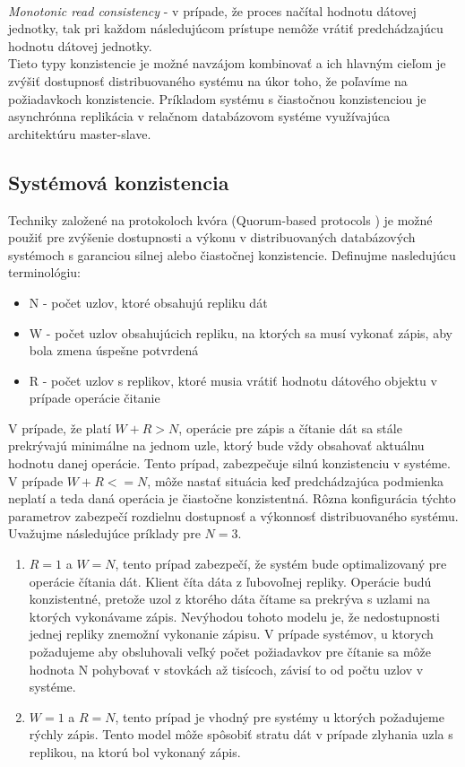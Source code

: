 \documentclass[11pt,twoside,a4paper]{book}
\begin{document}
\noindent 
\\
\emph{Monotonic read consistency} - v prípade, že proces načítal hodnotu dátovej jednotky, tak pri každom následujúcom prístupe nemôže vrátiť predchádzajúcu hodnotu dátovej jednotky. \\



Tieto typy konzistencie je možné navzájom kombinovať a ich hlavným cieľom je zvýšiť dostupnosť distribuovaného systému na úkor toho, že poľavíme na požiadavkoch konzistencie. Príkladom systému s čiastočnou konzistenciou je asynchrónna replikácia v relačnom databázovom systéme využívajúca architektúru master-slave.

\subsection{Systémová konzistencia}

Techniky založené na protokoloch kvóra (Quorum-based protocols \cite{gifford1979weighted}) je možné použiť pre zvýšenie dostupnosti a výkonu v distribuovaných databázových systémoch s garanciou silnej alebo čiastočnej konzistencie. Definujme nasledujúcu terminológiu:
\begin{itemize}
 \item N - počet uzlov, ktoré obsahujú repliku dát
 \item W - počet uzlov obsahujúcich repliku, na ktorých sa musí vykonať zápis, aby bola zmena úspešne potvrdená
 \item R - počet uzlov s replikov, ktoré musia vrátiť hodnotu dátového objektu v prípade operácie čitanie
\end{itemize}

V prípade, že platí $W + R > N$, operácie pre zápis a čítanie dát sa stále prekrývajú minimálne na jednom uzle, ktorý bude vždy obsahovať aktuálnu hodnotu danej operácie. Tento prípad, zabezpečuje silnú konzistenciu v systéme. V prípade $W + R <= N$, môže nastať situácia keď predchádzajúca podmienka neplatí a teda daná operácia je čiastočne konzistentná. Rôzna konfigurácia týchto parametrov zabezpečí rozdielnu dostupnosť a výkonnosť distribuovaného systému.  Uvažujme následujúce príklady pre $N = 3$.

\begin{enumerate}
 \item $R = 1$ a $W = N$, tento prípad zabezpečí, že systém bude optimalizovaný pre operácie čítania dát. Klient číta dáta z ľubovoľnej repliky. Operácie budú konzistentné, pretože uzol z ktorého dáta čítame sa prekrýva s uzlami na ktorých vykonávame zápis. Nevýhodou tohoto modelu je, že nedostupnosti jednej repliky znemožní vykonanie zápisu. V prípade systémov, u ktorych požadujeme aby obsluhovali veľký počet požiadavkov pre čítanie sa môže hodnota N pohybovať v stovkách až tisícoch, závisí to od počtu uzlov v systéme.
 \item $W = 1$ a $R = N$, tento prípad je vhodný pre systémy u ktorých požadujeme rýchly zápis. Tento model môže spôsobiť stratu dát v prípade zlyhania uzla s replikou, na ktorú bol vykonaný zápis.
\end{enumerate}
\end{document}
